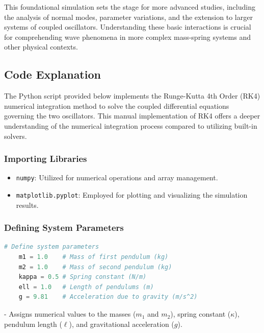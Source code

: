\documentclass[12pt]{report} %
\begin{document}
    This foundational simulation sets the stage for more advanced studies, including the analysis of normal modes, parameter variations, and the extension to larger systems of coupled oscillators. Understanding these basic interactions is crucial for comprehending wave phenomena in more complex mass-spring systems and other physical contexts.
    
    \newpage

    \subsection{Code Explanation}
    \label{subsec:part1_task2_code_explanation}
    
    The Python script provided below implements the Runge-Kutta 4th Order (RK4) numerical integration method to solve the coupled differential equations governing the two oscillators. This manual implementation of RK4 offers a deeper understanding of the numerical integration process compared to utilizing built-in solvers.
    
    \subsubsection{Importing Libraries}
    
    \begin{itemize}
        \item \texttt{numpy}: Utilized for numerical operations and array management.
        \item \texttt{matplotlib.pyplot}: Employed for plotting and visualizing the simulation results.
    \end{itemize}
    
    \subsubsection{Defining System Parameters}
    
    \begin{lstlisting}[language=Python, caption={Defining System Parameters}, label={lst:system_parameters}]
    # Define system parameters
    m1 = 1.0    # Mass of first pendulum (kg)
    m2 = 1.0    # Mass of second pendulum (kg)
    kappa = 0.5 # Spring constant (N/m)
    ell = 1.0   # Length of pendulums (m)
    g = 9.81    # Acceleration due to gravity (m/s^2)
    \end{lstlisting}
    
    - Assigns numerical values to the masses (\( m_1 \) and \( m_2 \)), spring constant (\( \kappa \)), pendulum length (\( \ell \)), and gravitational acceleration (\( g \)).
    
\end{document}
